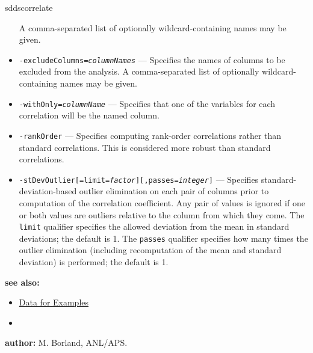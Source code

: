 \begin{sddsprog}{sddscorrelate}
\begin{itemize}
    A comma-separated list of optionally wildcard-containing names may be given.
  \item {\tt -excludeColumns={\em columnNames}} --- Specifies the names of columns to be excluded from the
    analysis. A comma-separated list of optionally wildcard-containing names may be given.
  \item {\tt -withOnly={\em columnName}} --- Specifies that one of the variables for each correlation will be
    the named column.
  \item {\tt -rankOrder} --- Specifies computing rank-order correlations rather than standard correlations.
    This is considered more robust than standard correlations.
  \item {\tt -stDevOutlier[=limit={\em factor}][,passes={\em integer}]} --- Specifies standard-deviation-based
    outlier elimination on each pair of columns prior to computation of the correlation coefficient.
    Any pair of values is ignored if one or both values are outliers relative to the column from which they come.
    The {\tt limit} qualifier specifies the allowed deviation from the mean in standard deviations; the
    default is 1. The {\tt passes} qualifier specifies how many times the outlier elimination (including
    recomputation of the mean and standard deviation) is performed; the default is 1.
  \end{itemize}
\item \textbf{see also:}
  \begin{itemize}
  \item \hyperref[exampleData]{Data for Examples}
  \item {}
  \end{itemize}
\item \textbf{author:} M. Borland, ANL/APS.
\end{sddsprog}


